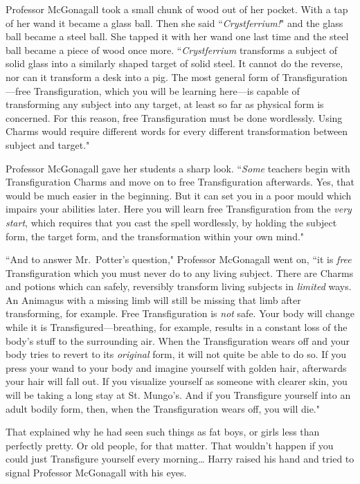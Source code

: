 Professor McGonagall took a small chunk of wood out of her pocket. With a tap of her wand it became a glass ball. Then she said ``\emph{Crystferrium!}" and the glass ball became a steel ball. She tapped it with her wand one last time and the steel ball became a piece of wood once more. ``\emph{Crystferrium} transforms a subject of solid glass into a similarly shaped target of solid steel. It cannot do the reverse, nor can it transform a desk into a pig. The most general form of Transfiguration—free Transfiguration, which you will be learning here—is capable of transforming any subject into any target, at least so far as physical form is concerned. For this reason, free Transfiguration must be done wordlessly. Using Charms would require different words for every different transformation between subject and target."

Professor McGonagall gave her students a sharp look. ``\emph{Some} teachers begin with Transfiguration Charms and move on to free Transfiguration afterwards. Yes, that would be much easier in the beginning. But it can set you in a poor mould which impairs your abilities later. Here you will learn free Transfiguration from the \emph{very start}, which requires that you cast the spell wordlessly, by holding the subject form, the target form, and the transformation within your own mind."

``And to answer Mr.~Potter's question," Professor McGonagall went on, ``it is \emph{free} Transfiguration which you must never do to any living subject. There are Charms and potions which can safely, reversibly transform living subjects in \emph{limited} ways. An Animagus with a missing limb will still be missing that limb after transforming, for example. Free Transfiguration is \emph{not} safe. Your body will change while it is Transfigured—breathing, for example, results in a constant loss of the body's stuff to the surrounding air. When the Transfiguration wears off and your body tries to revert to its \emph{original} form, it will not quite be able to do so. If you press your wand to your body and imagine yourself with golden hair, afterwards your hair will fall out. If you visualize yourself as someone with clearer skin, you will be taking a long stay at St. Mungo's. And if you Transfigure yourself into an adult bodily form, then, when the Transfiguration wears off, you will die."

That explained why he had seen such things as fat boys, or girls less than perfectly pretty. Or old people, for that matter. That wouldn't happen if you could just Transfigure yourself every morning{\ldots} Harry raised his hand and tried to signal Professor McGonagall with his eyes.

